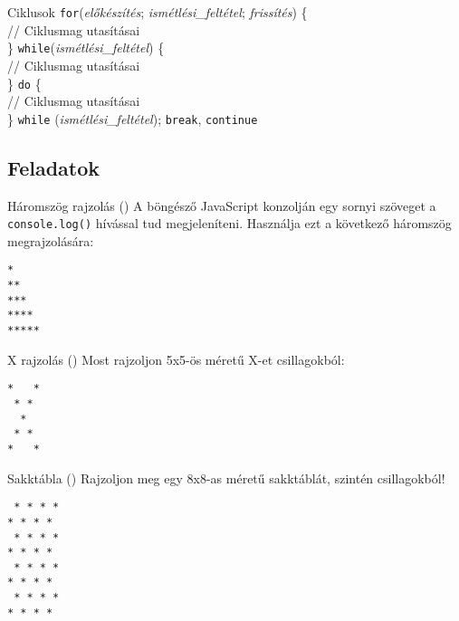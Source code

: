 \begin{frame}
    Ciklusok
    \vfill
    \texttt{for}(\emph{előkészítés}; \emph{ismétlési\_feltétel}; \emph{frissítés}) \{ \\
    \qquad // Ciklusmag utasításai \\
    \}
    \vfill
    \texttt{while}(\emph{ismétlési\_feltétel}) \{ \\
    \qquad // Ciklusmag utasításai \\
    \}
    \vfill
    \texttt{do} \{ \\
    \qquad // Ciklusmag utasításai \\
    \} \texttt{while} (\emph{ismétlési\_feltétel});
    \vfill
    \texttt{break}, \texttt{continue}
\end{frame}

\subsection{Feladatok}

\begin{frame}[fragile]
    \begin{exampleblock}{Háromszög rajzolás ()}
        A böngésző JavaScript konzolján egy sornyi szöveget a \texttt{console.log()} hívással tud megjeleníteni. Használja ezt a következő háromszög megrajzolására:\\
        \begin{verbatim}
*
**
***
****
*****                
\end{verbatim}
    \end{exampleblock}
\end{frame}

\begin{frame}[fragile]
    \begin{exampleblock}{X rajzolás ()}
        Most rajzoljon 5x5-ös méretű X-et csillagokból:\\
        \begin{verbatim}
*   *
 * *
  *
 * *
*   *            
\end{verbatim}
    \end{exampleblock}
\end{frame}

\begin{frame}[fragile]
    \begin{exampleblock}{Sakktábla ()}
        Rajzoljon meg egy 8x8-as méretű sakktáblát, szintén csillagokból!\\
        \begin{verbatim}
 * * * *
* * * *
 * * * *
* * * *
 * * * *
* * * *
 * * * *
* * * *
\end{verbatim}
    \end{exampleblock}
\end{frame}

